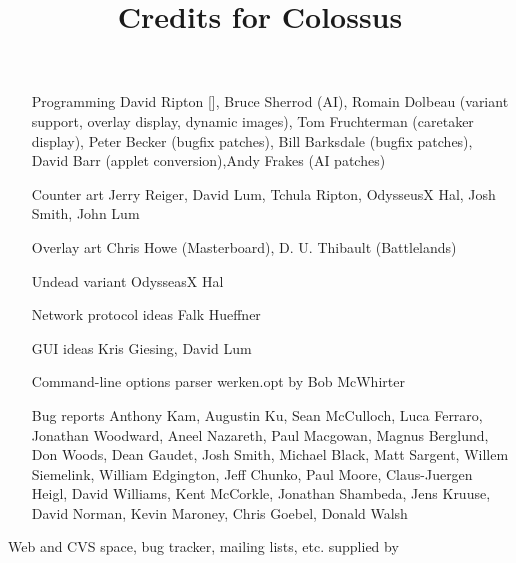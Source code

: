 \documentclass{article}
\begin{document}

\title{Credits for Colossus}

\maketitle

\begin{itemize}

\item[Programming] David Ripton [], Bruce Sherrod (AI), Romain Dolbeau (variant support, overlay display, dynamic images), Tom Fruchterman (caretaker display), Peter Becker (bugfix patches), Bill Barksdale (bugfix patches), David Barr (applet conversion),Andy Frakes (AI patches)

\item[Counter art] Jerry Reiger, David Lum, Tchula Ripton, OdysseusX Hal, Josh Smith, John Lum

\item[Overlay art] Chris Howe (Masterboard), D. U. Thibault (Battlelands)

\item[Undead variant] OdysseasX Hal

\item[Network protocol ideas] Falk Hueffner

\item[GUI ideas] Kris Giesing, David Lum

\item[Command-line options parser] werken.opt by Bob McWhirter

\item[Bug reports] Anthony Kam, Augustin Ku, Sean McCulloch, Luca Ferraro, Jonathan Woodward, Aneel Nazareth, Paul Macgowan, Magnus Berglund, Don Woods, Dean Gaudet, Josh Smith, Michael Black, Matt Sargent, Willem Siemelink, William Edgington, Jeff Chunko, Paul Moore, Claus-Juergen Heigl, David Williams, Kent McCorkle, Jonathan Shambeda, Jens Kruuse, David Norman, Kevin Maroney, Chris Goebel, Donald Walsh


\end{itemize}

Web and CVS space, bug tracker, mailing lists, etc. supplied by 
\end{document}
